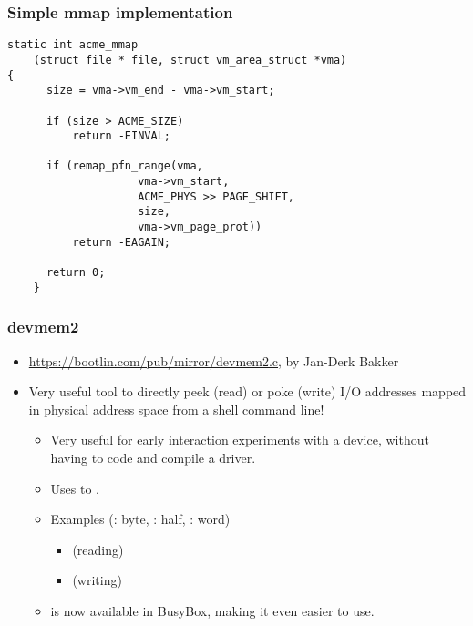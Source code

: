 \begin{frame}[fragile]
  \frametitle{Simple mmap implementation}
  \begin{verbatim}
static int acme_mmap
    (struct file * file, struct vm_area_struct *vma)
{
      size = vma->vm_end - vma->vm_start;

      if (size > ACME_SIZE)
          return -EINVAL;

      if (remap_pfn_range(vma,
                    vma->vm_start,
                    ACME_PHYS >> PAGE_SHIFT,
                    size,
                    vma->vm_page_prot))
          return -EAGAIN;

      return 0;
    }
  \end{verbatim}
\end{frame}

\begin{frame}
  \frametitle{devmem2}
  \begin{itemize}
  \item \url{https://bootlin.com/pub/mirror/devmem2.c}, by Jan-Derk
    Bakker
  \item Very useful tool to directly peek (read) or poke
    (write) I/O addresses mapped in physical address space from a
    shell command line!
    \begin{itemize}
    \item Very useful for early interaction experiments with a device,
      without having to code and compile a driver.
    \item Uses  to .
    \item Examples (: byte, : half, : word)
      \begin{itemize}
      \item {} (reading)
      \item {} (writing)
      \end{itemize}
    \item {} is now available in BusyBox, making it even easier to
      use.
    \end{itemize}
  \end{itemize}
\end{frame}

